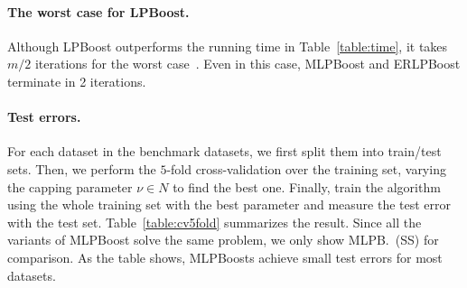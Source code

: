 \paragraph{The worst case for LPBoost.} 
Although LPBoost outperforms the running time 
in Table~\ref{table:time}, 
it takes $m/2$ iterations for the worst case~\citep{warmuth+:nips07}. 
Even in this case, MLPBoost and ERLPBoost terminate in 2 iterations. 
\paragraph{Test errors.} 
For each dataset in the benchmark datasets, 
we first split them into train/test sets. 
Then, we perform the $5$-fold cross-validation over the training set, 
varying the capping parameter $\nu \in N$ to find the best one. 
Finally, train the algorithm using the whole training set 
with the best parameter and measure the test error with the test set. 
Table~\ref{table:cv5fold} summarizes the result. 
Since all the variants of MLPBoost solve the same problem, 
we only show MLPB.~(SS) for comparison. 
As the table shows, MLPBoosts achieve small test errors 
for most datasets. 
\begin{table}[h]
    \caption{%
        Test errors for $5$-fold cross validation %
        for the best parameters. 
    }
    \label{table:cv5fold}
    \bigskip
    \centering
    
\end{table}

